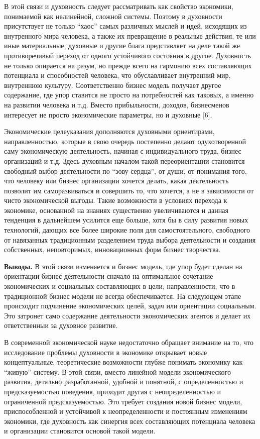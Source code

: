 В этой связи и духовность следует рассматривать как свойство экономики,
понимаемой как нелинейной, сложной системы. Поэтому в духовности
присутствует не только ``хаос'' самых различных мыслей и идей, исходящих
из внутренного мира человека, а также их превращение в реальные
действия, те или иные материальные, духовные и другие блага представляет
на деле такой же противоречивый переход от одного устойчивого состояния
в другое. Духовность не только опирается на разум, но прежде всего на
гармонию всех составляющих потенциала и способностей человека, что
обуславливает внутренний мир, внутреннюю культуру. Соответственно бизнес
модель получает другое содержание, где упор ставится не просто на
потребностей как таковых, а именно на развитии человека и т.д. Вместо
прибыльности, доходов, бизнесменов интересует не просто экономические
параметры, но и духовные {[}6{]}.

Экономические целеуказания дополняются духовными ориентирами,
направленностью, которые в свою очередь постепенно делают одухотворенной
саму экономическую деятельность, начиная с индивидуального труда, бизнес
организаций и т.д. Здесь духовным началом такой переориентации
становится свободный выбор деятельности по ``зову сердца'', от души, от
понимания того, что человеку или бизнес организации хочется делать,
какая деятельность позволит им саморазвиваться и совершить то, что
хочется, а не в зависимости от чисто экономической выгоды. Такие
возможности в условиях перехода к экономике, основанной на знаниях
существенно увеличиваются и данная тенденция в дальнейшем усилится еще
больше, хотя бы в силу развития новых технологий, дающих все более
широкие поля для самостоятельного, свободного от навязанных традиционным
разделением труда выбора деятельности и создания собственных,
неповторимых, инновационных форм бизнес творчества.

{\bfseries Выводы.} В этой связи изменяется и бизнес модель, где упор будет
сделан на ориентации бизнес деятельности сначало на оптимальное
сочетание экономических и социальных составляющих в цели,
направленности, что в традиционной бизнес модели не всегда
обеспечивается. На следующем этапе происходит подчинение экономических
целей, задач или ориентации социальным. Это затронет само содержание
деятельности экономических агентов и делает их ответственныи за духовное
развитие.

В современной экономической науке недостаточно обращает внимание на то,
что исследование проблемы духовности в экономике открывает новые
концептуальные, теоретические возможности глубже понимать экономику как
``живую'' систему. В этой связи, вместо линейной модели экономического
развития, детально разработанной, удобной и понятной, с определенностью
и предсказуемостью поведения, приходит другая с неопределенностью и
ограниченной предсказуемостью. Это требует создания новой бизнес модели,
приспособленной и устойчивой к неопределенности и постоянным изменениям
экономики, где духовность как синергия всех составляющих потенциала
человека и организации становится основой такой модели.

